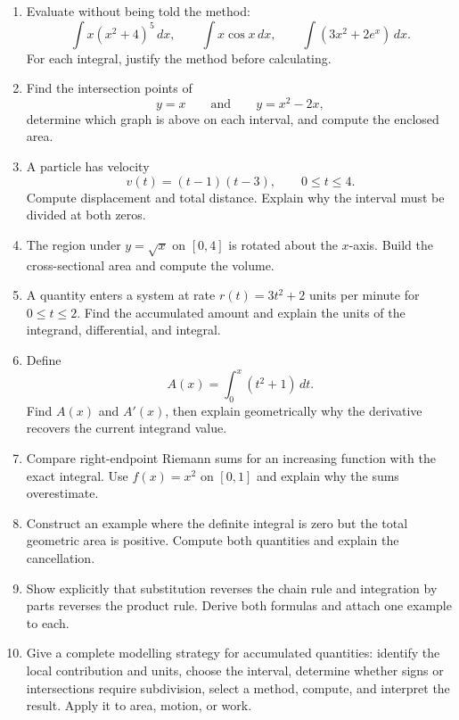 \begin{enumerate}
\item Evaluate without being told the method:
\[
\int x(x^2+4)^5\,dx,
\qquad
\int x\cos x\,dx,
\qquad
\int(3x^2+2e^x)\,dx.
\]
For each integral, justify the method before calculating.

\item Find the intersection points of
\[
y=x
\qquad\text{and}\qquad
y=x^2-2x,
\]
determine which graph is above on each interval, and compute the enclosed area.

\item A particle has velocity
\[
v(t)=(t-1)(t-3),
\qquad0\le t\le4.
\]
Compute displacement and total distance. Explain why the interval must be divided at both zeros.

\item The region under $y=\sqrt{x}$ on $[0,4]$ is rotated about the $x$-axis. Build the cross-sectional area and compute the volume.

\item A quantity enters a system at rate $r(t)=3t^2+2$ units per minute for $0\le t\le2$. Find the accumulated amount and explain the units of the integrand, differential, and integral.

\item Define
\[
A(x)=\int_0^x(t^2+1)\,dt.
\]
Find $A(x)$ and $A'(x)$, then explain geometrically why the derivative recovers the current integrand value.

\item Compare right-endpoint Riemann sums for an increasing function with the exact integral. Use $f(x)=x^2$ on $[0,1]$ and explain why the sums overestimate.

\item Construct an example where the definite integral is zero but the total geometric area is positive. Compute both quantities and explain the cancellation.

\item Show explicitly that substitution reverses the chain rule and integration by parts reverses the product rule. Derive both formulas and attach one example to each.

\item Give a complete modelling strategy for accumulated quantities: identify the local contribution and units, choose the interval, determine whether signs or intersections require subdivision, select a method, compute, and interpret the result. Apply it to area, motion, or work.
\end{enumerate}

